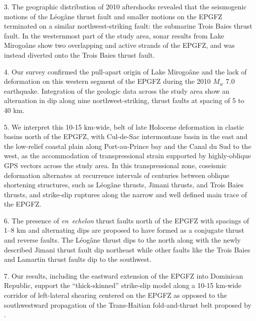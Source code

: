 \documentclass[linenumbers,draft]{agujournal}
\begin{document}
3. The geographic distribution of 2010 aftershocks revealed that the seismogenic motions of the L\'eog\^ane thrust fault and smaller motions on the EPGFZ terminated on a similar northwest-striking fault: the submarine Trois Baies thrust fault. In the westernmost part of the study area, sonar results from Lake Mirogo\^ane show two overlapping and active strands of the EPGFZ, and was instead diverted onto the Trois Baies thrust fault.

4. Our survey confirmed the pull-apart origin of Lake Mirogo\^ane and the lack of deformation on this western segment of the EPGFZ during the 2010 $M_w$ 7.0 earthquake. Integration of the geologic data across the study area show an alternation in dip along nine northwest-striking, thrust faults at spacing of 5 to 40 km.

5.  We interpret this 10-15 km-wide, belt of late Holocene deformation in clastic basins north of the EPGFZ, with Cul-de-Sac intermontane basin in the east and the low-relief coastal plain along Port-au-Prince bay and the Canal du Sud to the west, as the accommodation of transpressional strain supported by highly-oblique GPS vectors across the study area. In this transpressional zone, coseismic deformation alternates at recurrence intervals of centuries between oblique shortening structures, such as L\'eog\^ane thrusts, Jimani thrusts, and Trois Baies thrusts, and strike-slip ruptures along the narrow and well defined main trace of the EPGFZ.

6. The presence of \textit{en~echelon} thrust faults north of the EPGFZ with spacings of 1--8 km and alternating dips are proposed to have formed as a conjugate thrust and reverse faults. The L\'eog\^ane thrust dips to the north along with the newly described Jimani thrust fault dip northeast while other faults like the Trois Baies and Lamartin thrust faults dip to the southwest.  

7. Our results, including the eastward extension of the EPGFZ into Dominican Republic, support the ``thick-skinned'' strike-slip model along a 10-15 km-wide corridor of left-lateral shearing centered on the EPGFZ as opposed to the southwestward propagation of the Trans-Haitian fold-and-thrust belt proposed by \citet{pubellier2000plate}.
 
\end{document}
